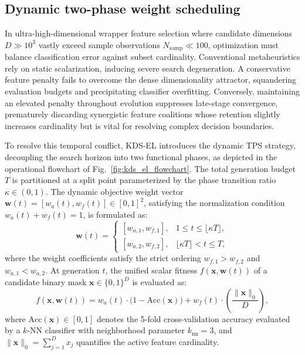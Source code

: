 \subsection{Dynamic two-phase weight scheduling}\label{sec:twophase}

In ultra-high-dimensional wrapper feature selection where candidate dimensions $D \gg 10^3$ vastly exceed sample observations $N_{\mathrm{samp}} \ll 100$, optimization must balance classification error against subset cardinality. Conventional metaheuristics rely on static scalarization, inducing severe search degeneration. A conservative feature penalty fails to overcome the dense dimensionality attractor, squandering evaluation budgets and precipitating classifier overfitting. Conversely, maintaining an elevated penalty throughout evolution suppresses late-stage convergence, prematurely discarding synergistic feature coalitions whose retention slightly increases cardinality but is vital for resolving complex decision boundaries.

To resolve this temporal conflict, KDS-EL introduces the dynamic TPS strategy, decoupling the search horizon into two functional phases, as depicted in the operational flowchart of Fig.~\ref{fig:kds_el_flowchart}. The total generation budget $T$ is partitioned at a split point parameterized by the phase transition ratio $\kappa \in (0, 1)$. The dynamic objective weight vector $\mathbf{w}(t) = [w_a(t), w_f(t)] \in [0, 1]^2$, satisfying the normalization condition $w_a(t) + w_f(t) = 1$, is formulated as:
\begin{equation}
\mathbf{w}(t) = \begin{cases}
[w_{a,1}, w_{f,1}], & 1 \le t \le \lfloor \kappa T \rfloor, \\[4pt]
[w_{a,2}, w_{f,2}], & \lfloor \kappa T \rfloor < t \le T,
\end{cases}
\label{eq:twophase}
\end{equation}
where the weight coefficients satisfy the strict ordering $w_{f,1} > w_{f,2}$ and $w_{a,1} < w_{a,2}$. At generation $t$, the unified scalar fitness $f(\mathbf{x}, \mathbf{w}(t))$ of a candidate binary mask $\mathbf{x} \in \{0, 1\}^D$ is evaluated as:
\begin{equation}
f(\mathbf{x}, \mathbf{w}(t)) = w_a(t) \cdot \bigl(1 - \mathrm{Acc}(\mathbf{x})\bigr) + w_f(t) \cdot \left(\frac{\|\mathbf{x}\|_0}{D}\right),
\label{eq:fitness}
\end{equation}
where $\mathrm{Acc}(\mathbf{x}) \in [0, 1]$ denotes the 5-fold cross-validation accuracy evaluated by a $k$-NN classifier with neighborhood parameter $k_{\mathrm{nn}} = 3$, and $\|\mathbf{x}\|_0 = \sum_{j=1}^D x_j$ quantifies the active feature cardinality.

